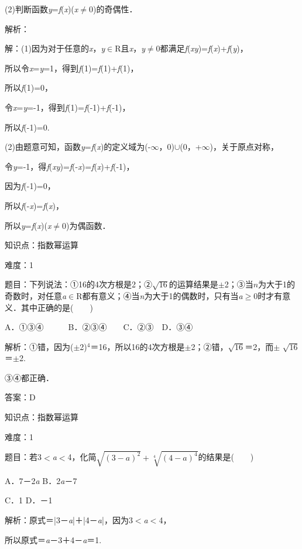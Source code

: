 \documentclass{article} %
\begin{document}
(2)判断函数\textit{y}=\textit{f}(\textit{x})(\textit{x}$\mathrm{\neq}$0)的奇偶性．

解析：

解：(1)因为对于任意的\textit{x}，\textit{y}$\mathrm{\in}$R且\textit{x}，\textit{y}$\mathrm{\neq}$0都满足\textit{f}(\textit{xy})=\textit{f}(\textit{x})+\textit{f}(\textit{y})，

所以令\textit{x}=\textit{y}=1，得到\textit{f}(1)=\textit{f}(1)+\textit{f}(1)，

所以\textit{f}(1)=0，

令\textit{x}=\textit{y}=-1，得到\textit{f}(1)=\textit{f}(-1)+\textit{f}(-1)，

所以\textit{f}(-1)=0.

(2)由题意可知，函数\textit{y}=\textit{f}(\textit{x})的定义域为(-$\mathrm{\infty}$，0)$\mathrm{\cup}$(0，+$\mathrm{\infty}$)，关于原点对称，

令\textit{y}=-1，得\textit{f}(\textit{xy})=\textit{f}(-\textit{x})=\textit{f}(\textit{x})+\textit{f}(-1)，

因为\textit{f}(-1)=0，

所以\textit{f}(-\textit{x})=\textit{f}(\textit{x})，

所以\textit{y}=\textit{f}(\textit{x})(\textit{x}$\mathrm{\neq}$0)为偶函数．

知识点：指数幂运算

难度：1

题目：下列说法：①16的4次方根是2；②$\sqrt{16}$的运算结果是$\mathrm{\pm}$2；③当$\textit{n}$为大于1的奇数时，对任意\textit{a}$\mathrm{\in}$R都有意义；④当\textit{n}为大于1的偶数时，只有当\textit{a}$\mathrm{\ge}$0时才有意义．其中正确的是(　　)

A．①③④　　　B．②③④　　C．②③　D．③④

解析：①错，因为($\pm$2)${}^{4}$＝16，所以16的4次方根是$\pm$2；②错，$\sqrt{16}$＝2，而$\pm$ $\sqrt{16}$＝$\pm$2.

③④都正确．

答案：D

知识点：指数幂运算

难度：1

题目：若3$\mathrm{<}$\textit{a}$\mathrm{<}$4，化简$\sqrt{(3-a)^{2}}+\sqrt[4]{(4-a)^{4}}$的结果是(　　)

A．7－2\textit{a}   B．2\textit{a}－7

C．1   D．－1

解析：原式＝|3－\textit{a}|＋|4－\textit{a}|，因为3$\mathrm{<}$\textit{a}$\mathrm{<}$4，

所以原式＝\textit{a}－3＋4－\textit{a}＝1.
\end{document}

